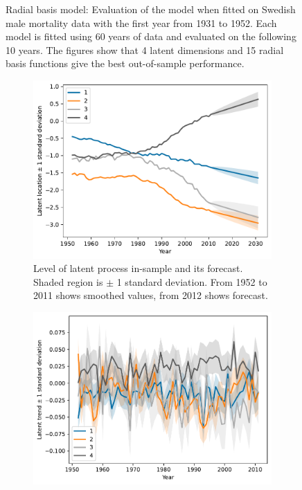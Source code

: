 \documentclass[11pt]{article}
\begin{document}
\begin{figure}
\begin{subfigure}[t]{0.49\textwidth}
        \caption{}
    \end{subfigure}
    \hfill
        \caption{Radial basis model: Evaluation of the model when fitted on Swedish male mortality data with the first year from 1931 to 1952. Each model is fitted using 60 years of data and evaluated on the following 10 years. The figures show that 4 latent dimensions and 15 radial basis functions give the best out-of-sample performance.}
        \label{fig:radial_model_evaluation_sweden}
\end{figure}
\begin{figure}
    \centering
    \begin{subfigure}[t]{0.45\textwidth}
        \centering
        \includegraphics[width=\textwidth]{figs/sweden_radial_basis_1952_2011_Male_100_15_4latent_forecast.pdf}
        \caption{Level of latent process in-sample and its forecast. Shaded region is $\pm$ 1 standard deviation. From 1952 to 2011 shows smoothed values, from 2012 shows forecast.}
    \end{subfigure}
    \hfill
    \begin{subfigure}[t]{0.45\textwidth}
        \centering
        \includegraphics[width=\textwidth]{figs/sweden_radial_basis_1952_2011_Male_100_15_4latent_trend.pdf}

\end{subfigure}
\end{figure}
\end{document}

